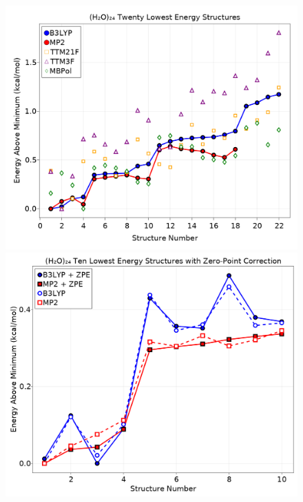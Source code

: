\begin{figure}[t]
\uwsinglespace
\begin{center}
\begin{minipage}{0.45\textwidth}
\includegraphics[width=\textwidth]{Figures/Chapter_6/w24_lowest_22_dipole_structures.png}
\end{minipage}
\begin{minipage}{0.45\textwidth}
\includegraphics[width=\textwidth]{Figures/Chapter_6/w24_lowest_ten_structures_plus_zpe.png}
\end{minipage}

\end{center}
\end{figure}
